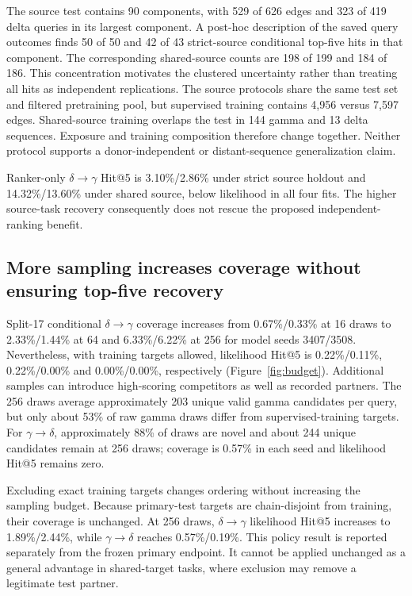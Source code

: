 \documentclass[10pt]{article}
\newcommand{\gtd}{\ensuremath{\gamma\!\rightarrow\!\delta}}
\newcommand{\dtg}{\ensuremath{\delta\!\rightarrow\!\gamma}}
\begin{document}
The source test contains 90 components, with 529 of 626 edges and 323 of 419
delta queries in its largest component. A post-hoc description of the saved
query outcomes finds 50 of 50 and 42 of 43 strict-source conditional top-five
hits in that component. The corresponding shared-source counts are 198 of 199
and 184 of 186. This concentration motivates the clustered uncertainty rather
than treating all hits as independent replications. The source protocols share
the same test set and filtered pretraining pool, but supervised training contains
4,956 versus 7,597 edges. Shared-source training overlaps the test in 144 gamma
and 13 delta sequences. Exposure and training composition therefore change
together. Neither protocol supports a donor-independent or distant-sequence
generalization claim.

Ranker-only \dtg{} Hit@5 is 3.10\%/2.86\% under strict source holdout and
14.32\%/13.60\% under shared source, below likelihood in all four fits.
The higher source-task recovery consequently does not rescue the proposed
independent-ranking benefit.

\subsection{More sampling increases coverage without ensuring top-five recovery}
Split-17 conditional \dtg{} coverage increases from 0.67\%/0.33\% at 16
draws to 2.33\%/1.44\% at 64 and 6.33\%/6.22\% at 256 for model seeds
3407/3508. Nevertheless, with training targets allowed, likelihood Hit@5 is
0.22\%/0.11\%, 0.22\%/0.00\% and 0.00\%/0.00\%, respectively
(Figure~\ref{fig:budget}). Additional samples can introduce high-scoring
competitors as well as recorded partners. The 256 draws average approximately
203 unique valid gamma candidates per query, but only about 53\% of raw
gamma draws differ from supervised-training targets. For \gtd{}, approximately
88\% of draws are novel and about 244 unique candidates remain at 256 draws;
coverage is 0.57\% in each seed and likelihood Hit@5 remains zero.

Excluding exact training targets changes ordering without increasing the
sampling budget. Because primary-test targets are chain-disjoint from training,
their coverage is unchanged. At 256 draws, \dtg{} likelihood Hit@5 increases
to 1.89\%/2.44\%, while \gtd{} reaches 0.57\%/0.19\%. This policy result
is reported separately from the frozen primary endpoint. It cannot be applied
unchanged as a general advantage in shared-target tasks, where exclusion may
remove a legitimate test partner.
\end{document}
